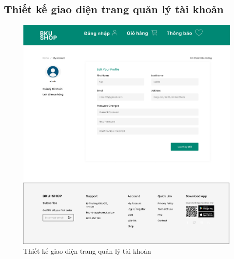 \subsection {Thiết kế giao diện trang quản lý tài khoản}
\begin{figure}[H]
    \begin{center}
    \includegraphics[scale=0.2]{images/hieu/chap-4/account.jpg}
    \vspace*{5mm}
    \caption{Thiết kế giao diện trang quản lý tài khoản}
    \end{center}
\end{figure}

